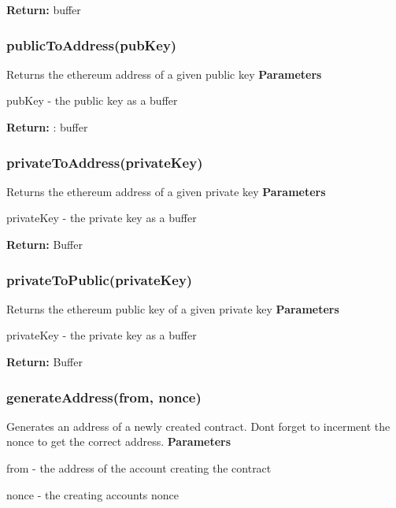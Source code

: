 {\bfseries Return\+:} {\ttfamily buffer}

\subsubsection*{{\ttfamily public\+To\+Address(pub\+Key)}}

Returns the ethereum address of a given public key {\bfseries Parameters}
\begin{DoxyItemize}
\item {\ttfamily pub\+Key} -\/ the public key as a {\ttfamily buffer}
\end{DoxyItemize}

{\bfseries Return\+:} \+: {\ttfamily buffer}

\subsubsection*{{\ttfamily private\+To\+Address(private\+Key)}}

Returns the ethereum address of a given private key {\bfseries Parameters}
\begin{DoxyItemize}
\item {\ttfamily private\+Key} -\/ the private key as a {\ttfamily buffer}
\end{DoxyItemize}

{\bfseries Return\+:} {\ttfamily Buffer}

\subsubsection*{{\ttfamily private\+To\+Public(private\+Key)}}

Returns the ethereum public key of a given private key {\bfseries Parameters}
\begin{DoxyItemize}
\item {\ttfamily private\+Key} -\/ the private key as a {\ttfamily buffer}
\end{DoxyItemize}

{\bfseries Return\+:} {\ttfamily Buffer}

\subsubsection*{{\ttfamily generate\+Address(from, nonce)}}

Generates an address of a newly created contract. Don\textquotesingle{}t forget to incerment the nonce to get the correct address. {\bfseries Parameters}
\begin{DoxyItemize}
\item {\ttfamily from} -\/ the address of the account creating the contract
\item {\ttfamily nonce} -\/ the creating accounts nonce
\end{DoxyItemize}


